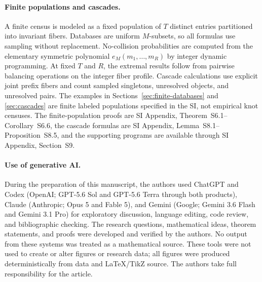 \documentclass[9pt,twoside]{pnas-new}
\theoremstyle{definition}
\theoremstyle{remark}
\newcommand{\SILocation}[1]{SI Appendix, #1}
\newcommand{\SIFiniteMoments}{Theorem~S6.1}
\newcommand{\SISupportCompression}{Corollary~S6.6}
\newcommand{\SICascadeSingletons}{Lemma~S8.1}
\newcommand{\SICascadeBreakEven}{Proposition~S8.5}
\newcommand{\SIReproducibilitySection}{Section~S9}
\begin{document}
\paragraph{Finite populations and cascades.}
A finite census is modeled as a fixed population of $T$ distinct entries partitioned into invariant fibers.  Databases are uniform $M$-subsets, so all formulas use sampling without replacement.  No-collision probabilities are computed from the elementary symmetric polynomial $e_M(m_1,\ldots,m_R)$ by integer dynamic programming.  At fixed $T$ and $R$, the extremal results follow from pairwise balancing operations on the integer fiber profile.  Cascade calculations use explicit joint prefix fibers and count sampled singletons, unresolved objects, and unresolved pairs.  The examples in Sections~\ref{sec:finite-databases} and \ref{sec:cascades} are finite labeled populations specified in the SI, not empirical knot censuses.  The finite-population proofs are \SILocation{\SIFiniteMoments{}--\SISupportCompression{}}, the cascade formulas are \SILocation{\SICascadeSingletons{}--\SICascadeBreakEven{}}, and the supporting programs are available through \SILocation{\SIReproducibilitySection{}}.

\paragraph{Use of generative AI.}
During the preparation of this manuscript, the authors used ChatGPT and Codex (OpenAI; GPT-5.6 Sol and GPT-5.6 Terra through both products), Claude (Anthropic; Opus 5 and Fable 5), and Gemini (Google; Gemini 3.6 Flash and Gemini 3.1 Pro) for exploratory discussion, language editing, code review, and bibliographic checking. The research questions, mathematical ideas, theorem statements, and proofs were developed and verified by the authors. No output from these systems was treated as a mathematical source. These tools were not used to create or alter figures or research data; all figures were produced deterministically from data and \LaTeX/TikZ source. The authors take full responsibility for the article.
\end{document}
